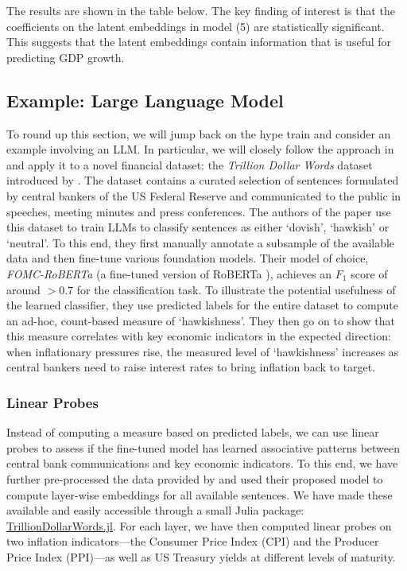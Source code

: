 \documentclass{article}
\theoremstyle{plain}
\theoremstyle{definition}
\theoremstyle{remark}
\begin{document}
The results are shown in the table below. The key finding of interest is
that the coefficients on the latent embeddings in model (5) are
statistically significant. This suggests that the latent embeddings
contain information that is useful for predicting GDP growth.



\subsection{Example: Large Language Model}\label{ex-llm}

To round up this section, we will jump back on the hype train and
consider an example involving an LLM. In particular, we will closely
follow the approach in \cite{gurnee2023language} and apply it to a novel
financial dataset: the \emph{Trillion Dollar Words} dataset introduced
by \cite{shah2023trillion}. The dataset contains a curated
selection of sentences formulated by central bankers of the US Federal
Reserve and communicated to the public in speeches, meeting minutes and
press conferences. The authors of the paper use this dataset to train
LLMs to classify sentences as either `dovish', `hawkish' or `neutral'.
To this end, they first manually annotate a subsample of the available
data and then fine-tune various foundation models. Their model of
choice, \emph{FOMC-RoBERTa} (a fine-tuned version of RoBERTa \cite{liu2019roberta}), achieves an \(F_1\) score of around \(>0.7\) for the
classification task. To illustrate the potential usefulness of the
learned classifier, they use predicted labels for the entire dataset to
compute an ad-hoc, count-based measure of `hawkishness'. They then go on
to show that this measure correlates with key economic indicators in the
expected direction: when inflationary pressures rise, the measured level
of `hawkishness' increases as central bankers need to raise interest
rates to bring inflation back to target.

\subsubsection{Linear Probes}\label{linear-probes}

Instead of computing a measure based on predicted labels, we can use linear probes to assess if the fine-tuned model has learned associative patterns between central bank communications and key economic indicators. To this end, we have further pre-processed the data provided by \cite{shah2023trillion} and used their proposed model to compute layer-wise embeddings for all available sentences. We have made these available and easily accessible through a small Julia package: \href{https://github.com/pat-alt/TrillionDollarWords.jl}{TrillionDollarWords.jl}. For each layer, we have then computed linear probes on two inflation indicators---the Consumer Price Index (CPI) and the Producer Price Index (PPI)---as well as US Treasury yields at different levels of maturity. 
\end{document}
